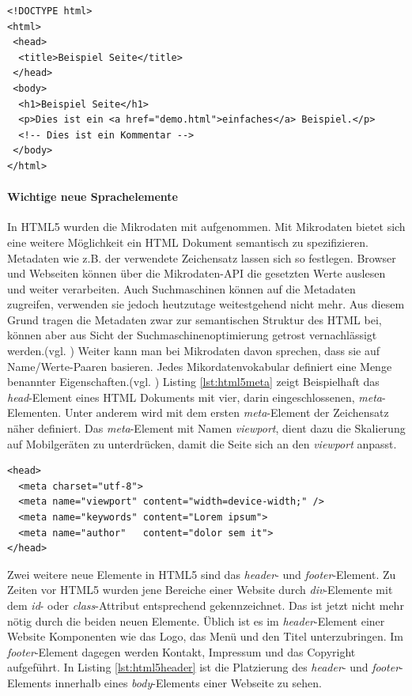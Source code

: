 \documentclass[12pt,a4paper,bibliography=totocnumbered,listof=totocnumbered]{scrartcl}
\begin{document}
	\vspace{1em}
	\begin{lstlisting}[caption=HTML5 Basis Dokument, label=lst:html5basicdoc]
<!DOCTYPE html>
<html>
 <head>
  <title>Beispiel Seite</title>
 </head>
 <body>
  <h1>Beispiel Seite</h1>
  <p>Dies ist ein <a href="demo.html">einfaches</a> Beispiel.</p>
  <!-- Dies ist ein Kommentar -->
 </body>
</html>
	\end{lstlisting}
	
\paragraph{Wichtige neue Sprachelemente} In HTML5 wurden die Mikrodaten mit aufgenommen. Mit Mikrodaten bietet sich eine weitere Möglichkeit ein HTML Dokument semantisch zu spezifizieren. Metadaten wie z.B. der verwendete Zeichensatz lassen sich so festlegen. Browser und Webseiten können über die Mikrodaten-\ac{API} die gesetzten Werte auslesen und weiter verarbeiten. Auch Suchmaschinen können auf die Metadaten zugreifen, verwenden sie jedoch heutzutage weitestgehend nicht mehr. Aus diesem Grund tragen die Metadaten zwar zur semantischen Struktur des HTML bei, können aber aus Sicht der Suchmaschinenoptimierung getrost vernachlässigt werden.(vgl. \cite{SelfHtml20142}) Weiter kann man bei Mikrodaten davon sprechen, \glqq [...] dass sie auf Name/Werte-Paaren basieren. Jedes Mikordatenvokabular definiert eine Menge benannter Eigenschaften.\grqq{}(vgl. \cite[S.174]{PilgDurc2011}) Listing \ref{lst:html5meta} zeigt Beispielhaft das \textit{head}-Element eines HTML Dokuments mit vier, darin eingeschlossenen, \textit{meta}-Elementen. Unter anderem wird mit dem ersten \textit{meta}-Element der Zeichensatz näher definiert. Das \textit{meta}-Element mit Namen \textit{viewport}, dient dazu die Skalierung auf Mobilgeräten zu unterdrücken, damit die Seite sich an den \textit{viewport} anpasst.

    \vspace{1em}
	\begin{lstlisting}[caption=HTML5 \textit{meta}-Element, label=lst:html5meta]
<head>
  <meta charset="utf-8">
  <meta name="viewport" content="width=device-width;" />
  <meta name="keywords" content="Lorem ipsum">
  <meta name="author"   content="dolor sem it">
</head>
	\end{lstlisting}
		
Zwei weitere neue Elemente in HTML5 sind das \textit{header}- und \textit{footer}-Element. Zu Zeiten vor HTML5 wurden jene Bereiche einer Website durch \textit{div}-Elemente mit dem \textit{id}- oder \textit{class}-Attribut entsprechend gekennzeichnet. Das ist jetzt nicht mehr nötig durch die beiden neuen Elemente. Üblich ist es im \textit{header}-Element einer Website Komponenten wie das Logo, das Menü und den Titel unterzubringen. Im \textit{footer}-Element dagegen werden Kontakt, Impressum und das Copyright aufgeführt. In Listing \ref{lst:html5header}	 ist die Platzierung des \textit{header}- und \textit{footer}-Elements innerhalb eines \textit{body}-Elements einer Webseite zu sehen.
\end{document}
